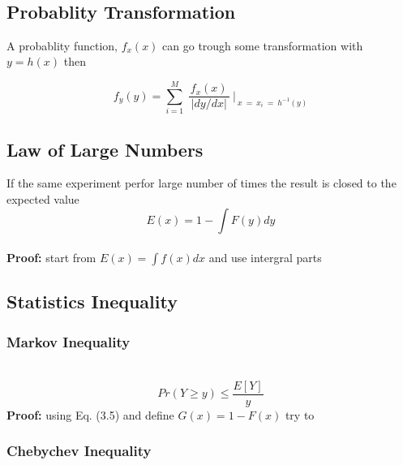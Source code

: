 ~\vspace{-2.5em}
\subsection{Probablity Transformation}
A probablity function, $f_x(x)$ can go trough some transformation with $y = h(x)$ then

\begin{equation}
f_y(y) = \sum_{i=1}^M ~\frac{f_x(x)}{~|dy/dx|~}~\biggr\rvert_{~x~=~x_i~=~h^{-1}(y)}
\end{equation}

\subsection{Law of Large Numbers}
If the same experiment perfor large number of times the result is closed to the expected value \cite{disp1}
\begin{equation}
E(x) = 1 - \int F(y) dy
\end{equation}
~\\\textbf{Proof:}
start from $E(x) = \int f(x) dx$ and use intergral parts
\subsection{Statistics Inequality}
\subsubsection{Markov Inequality}~
$$Pr(Y \geq y) \leq \frac{E[Y]}{y}$$
\textbf{Proof:}
using Eq. (3.5) and define $G(x) = 1 - F(x)$ try to 
\subsubsection{Chebychev Inequality}
~\\
